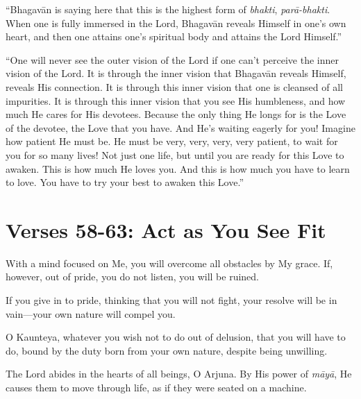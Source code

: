 \enquote{Bhagavān is saying here that this is the highest form of \textit{bhakti}, \textit{parā-bhakti}. When one is fully immersed in the Lord, Bhagavān reveals Himself in one’s own heart, and then one attains one’s spiritual body and attains the Lord Himself.}

\enquote{One will never see the outer vision of the Lord if one can’t perceive the inner vision of the Lord. It is through the inner vision that Bhagavān reveals Himself, reveals His connection. It is through this inner vision that one is cleansed of all impurities. It is through this inner vision that you see His humbleness, and how much He cares for His devotees. Because the only thing He longs for is the Love of the devotee, the Love that you have. And He’s waiting eagerly for you! Imagine how patient He must be. He must be very, very, very, very patient, to wait for you for so many lives! Not just one life, but until you are ready for this Love to awaken. This is how much He loves you. And this is how much you have to learn to love. You have to try your best to awaken this Love.}

\section{Verses 58-63: Act as You See Fit}\label{sec-verses-58-63-act-as-you-see-fit}

{With a mind focused on Me, you will overcome all obstacles by My grace. If, however, out of pride, you do not listen, you will be ruined.}

{If you give in to pride, thinking that you will not fight, your resolve will be in vain---your own nature will compel you.}

{O Kaunteya, whatever you wish not to do out of delusion, that you will have to do, bound by the duty born from your own nature, despite being unwilling.}

{The Lord abides in the hearts of all beings, O Arjuna. By His power of \textit{māyā}, He causes them to move through life, as if they were seated on a machine.}

